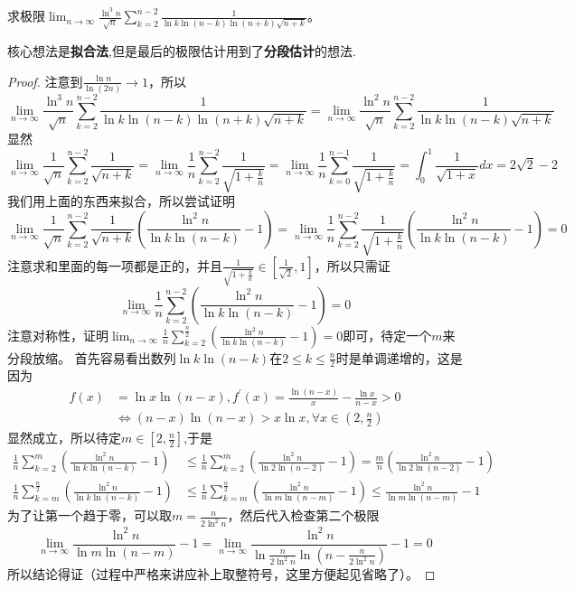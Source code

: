\documentclass[lang=cn,newtx,10pt,scheme=chinese]{elegantbook}
\begin{document}
\begin{example}
求极限\(\lim_{n\rightarrow\infty}\frac{\ln^3n}{\sqrt{n}}\sum_{k = 2}^{n - 2}\frac{1}{\ln k\ln(n - k)\ln(n + k)\sqrt{n + k}}\)。
\end{example}
\begin{note}
核心想法是\textbf{拟合法},但是最后的极限估计用到了\textbf{分段估计}的想法.
\end{note}
\begin{proof}
注意到\(\frac{\ln n}{\ln(2n)}\to1\)，所以
\[
\lim_{n\rightarrow\infty}\frac{\ln^3n}{\sqrt{n}}\sum_{k = 2}^{n - 2}\frac{1}{\ln k\ln(n - k)\ln(n + k)\sqrt{n + k}}=\lim_{n\rightarrow\infty}\frac{\ln^2n}{\sqrt{n}}\sum_{k = 2}^{n - 2}\frac{1}{\ln k\ln(n - k)\sqrt{n + k}}
\]
显然
\[
\lim_{n\rightarrow\infty}\frac{1}{\sqrt{n}}\sum_{k = 2}^{n - 2}\frac{1}{\sqrt{n + k}}=\lim_{n\rightarrow\infty}\frac{1}{n}\sum_{k = 2}^{n - 2}\frac{1}{\sqrt{1+\frac{k}{n}}}=\lim_{n\rightarrow\infty}\frac{1}{n}\sum_{k = 0}^{n - 1}\frac{1}{\sqrt{1+\frac{k}{n}}}=\int_{0}^{1}\frac{1}{\sqrt{1 + x}}dx=2\sqrt{2}-2
\]
我们用上面的东西来拟合，所以尝试证明
\[
\lim_{n\rightarrow\infty}\frac{1}{\sqrt{n}}\sum_{k = 2}^{n - 2}\frac{1}{\sqrt{n + k}}\left(\frac{\ln^2n}{\ln k\ln(n - k)}-1\right)=\lim_{n\rightarrow\infty}\frac{1}{n}\sum_{k = 2}^{n - 2}\frac{1}{\sqrt{1+\frac{k}{n}}}\left(\frac{\ln^2n}{\ln k\ln(n - k)}-1\right)=0
\]
注意求和里面的每一项都是正的，并且\(\frac{1}{\sqrt{1+\frac{k}{n}}}\in\left[\frac{1}{\sqrt{2}},1\right]\)，所以只需证
\[
\lim_{n\rightarrow\infty}\frac{1}{n}\sum_{k = 2}^{n - 2}\left(\frac{\ln^2n}{\ln k\ln(n - k)}-1\right)=0
\]
注意对称性，证明\(\lim_{n\rightarrow\infty}\frac{1}{n}\sum_{k = 2}^{\frac{n}{2}}\left(\frac{\ln^2n}{\ln k\ln(n - k)}-1\right)=0\)即可，待定一个\(m\)来分段放缩。
首先容易看出数列\(\ln k\ln(n - k)\)在\(2\leq k\leq\frac{n}{2}\)时是单调递增的，这是因为
\begin{align*}
f(x)&=\ln x\ln(n - x),f^\prime(x)=\frac{\ln(n - x)}{x}-\frac{\ln x}{n - x}>0\\
&\Leftrightarrow(n - x)\ln(n - x)>x\ln x,\forall x\in\left(2,\frac{n}{2}\right)
\end{align*}
显然成立，所以待定$m\in[2,\frac{n}{2}]$,于是
\begin{align*}
\frac{1}{n}\sum_{k = 2}^{m}\left(\frac{\ln^2n}{\ln k\ln(n - k)}-1\right)&\leq\frac{1}{n}\sum_{k = 2}^{m}\left(\frac{\ln^2n}{\ln 2\ln(n - 2)}-1\right)=\frac{m}{n}\left(\frac{\ln^2n}{\ln 2\ln(n - 2)}-1\right)\\
\frac{1}{n}\sum_{k = m}^{\frac{n}{2}}\left(\frac{\ln^2n}{\ln k\ln(n - k)}-1\right)&\leq\frac{1}{n}\sum_{k = m}^{\frac{n}{2}}\left(\frac{\ln^2n}{\ln m\ln(n - m)}-1\right)\leq\frac{\ln^2n}{\ln m\ln(n - m)}-1
\end{align*}
为了让第一个趋于零，可以取\(m = \frac{n}{2\ln^2n}\)，然后代入检查第二个极限
\[
\lim_{n\rightarrow\infty}\frac{\ln^2n}{\ln m\ln(n - m)}-1=\lim_{n\rightarrow\infty}\frac{\ln^2n}{\ln\frac{n}{2\ln^2n}\ln\left(n-\frac{n}{2\ln^2n}\right)}-1 = 0
\]
所以结论得证（过程中严格来讲应补上取整符号，这里方便起见省略了）。
\end{proof}
\end{document}
